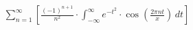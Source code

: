 \documentclass[preview]{standalone}
\begin{document}
\begin{align*}
\sum_{n=1}^{\infty} \left[ \frac{(-1)^{n+1}}{n^2} \cdot \int_{-\infty}^{\infty} e^{-t^2} \cdot \cos\left( \frac{2\pi n t}{x} \right) \, dt \right]
\end{align*}
\end{document}
